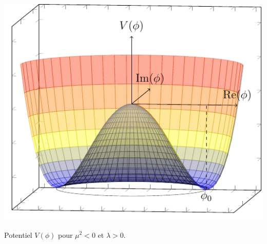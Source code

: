 \begin{minipagewithmarginpars}[h]{0.95\textwidth}
\centering
\includegraphics[scale=1]{SM/good.pdf}
\captionsetup{type=figure}\caption{Potentiel $V(\phi)$ pour $\mu^{2}<0$ et $\lambda>0$.}
\label{pot}
\end{minipagewithmarginpars}

